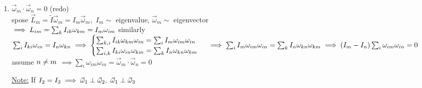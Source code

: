 \documentclass[12pt]{amsart}
\begin{document}
\begin{enumerate}
\hdashrule[0.5ex][c]{\linewidth}{0.5pt}{1.5mm}


\item \underline{ $\vec{\omega}_m \cdot \vec{\omega}_n = 0$} (redo)\\
spose $\vec{L}_m = \tilde{I} \vec{\omega}_m = I_m \vec{\omega}_m,\,\, I_m \sim$ eigenvalue, $\vec{\omega}_m \sim$ eigenvector\\
$\implies L_{im} = \sum_k I_{ik} \omega_{k m} = I_m \omega_{im}\\$
similarly $\sum_i I_{ki} \omega_{i n} = I_n \omega_{k n}\\
\implies \begin{cases} \sum_{k,i} I_{ik} \omega_{km} \omega_{in} = \sum_i I_m \omega_{im} \omega_{in}\\
\sum_{i,k} I_{ki} \omega_{in} \omega_{km} = \sum_k I_n \omega_{kn} \omega_{km} \end{cases}\\
\implies \sum_i I_m \omega_{im} \omega_{in} = \sum_k I_n \omega_{kn} \omega_{km}\\
\implies ( I_m - I_n ) \sum_i \omega_{im} \omega_{in} = 0\\$
assume $n \neq m\\$
$\implies \sum_i \omega_{im} \omega_{in} = \vec{\omega}_m \cdot \vec{\omega}_n = 0$


                                                                                                                                                                                                                                                                                                                                                                                                                                                                                                                                                                                                                                                                                                                                                                                                                                                                 
                                                                                                                                                                                                                                                                                                                                                                                                                                                                                                                                                                                                                                                                                                                                                                                                                                                                 \underline{Note:} If $I_2 = I_3 \implies \vec{\omega}_1 \perp \vec{\omega}_2,\,\, \vec{\omega}_1 \perp \vec{\omega}_3\\$



\end{enumerate}
\end{document}
